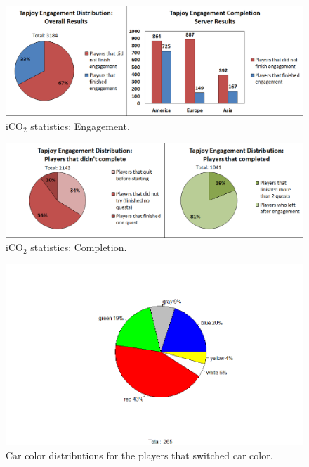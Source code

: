 \documentclass[preprint,authoryear,12pt]{elsarticle}
\begin{document}

\begin{figure}[htb]
	\begin{center}
		\includegraphics[width=.95\linewidth]{ijhcs14-img/engagement}
		\caption{iCO$_2$ statistics: Engagement.\label{fig:engagement}}
	\end{center}
\end{figure}

\begin{figure}[htb]
	\begin{center}
		\includegraphics[width=.95\linewidth]{ijhcs14-img/completion}
		\caption{iCO$_2$ statistics: Completion.\label{fig:completion}}
	\end{center}
\end{figure}


\begin{figure}[htb]
	\begin{center}
		\includegraphics[width=.95\linewidth]{ijhcs14-img/colour_all}
		\caption{Car color distributions for the players that switched car color.\label{fig:4diagrams_color}}
	\end{center}
\end{figure}
\end{document}
